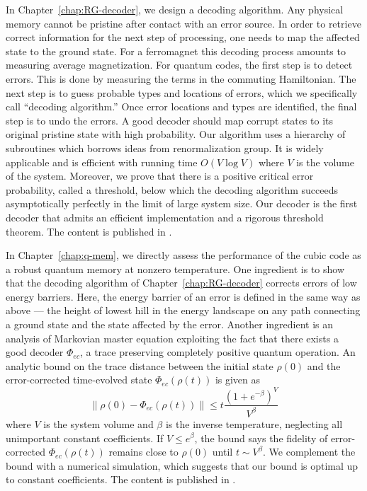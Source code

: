In Chapter~\ref{chap:RG-decoder}, we design a decoding algorithm. Any physical memory cannot be pristine after contact with an error source. In order to retrieve correct information for the next step of processing, one needs to map the affected state to the ground state. For a ferromagnet this decoding process amounts to measuring average magnetization. For quantum codes, the first step is to detect errors. This is done by measuring the terms in the commuting Hamiltonian. The next step is to guess probable types and locations of errors, which we specifically call ``decoding algorithm.'' Once error locations and types are identified, the final step is to undo the errors. A good decoder should map corrupt states to its original pristine state with high probability. Our algorithm uses a hierarchy of subroutines which borrows ideas from renormalization group. It is widely applicable and is efficient with running time $O(V\log V)$ where $V$ is the volume of the system. Moreover, we prove that there is a positive critical error probability, called a threshold, below which the decoding algorithm succeeds asymptotically perfectly in the limit of large system size. Our decoder is the first decoder that admits an efficient implementation and a rigorous threshold theorem.
The content is published in \cite{BravyiHaah2011Memory}.


In Chapter~\ref{chap:q-mem}, we directly assess the performance of the cubic code as a robust quantum memory at nonzero temperature. One ingredient is to show that the decoding algorithm of Chapter~\ref{chap:RG-decoder} corrects errors of low energy barriers. Here, the energy barrier of an error is defined in the same way as above --- the height of lowest hill in the energy landscape on any path connecting a ground state and the state affected by the error. Another ingredient is an analysis of Markovian master equation exploiting the fact that there exists a good decoder $\Phi_{ec}$, a trace preserving completely positive quantum operation. An analytic bound on the trace distance between the initial state $\rho(0)$ and the error-corrected time-evolved state $\Phi_{ec}(\rho(t))$ is given as
\[
\| \rho(0) - \Phi_{ec}(\rho(t)) \| \le t \frac{(1+e^{-\beta})^V}{V^{\beta}}
\]
where $V$ is the system volume and $\beta$ is the inverse temperature, neglecting all unimportant constant coefficients. If $V \le e^\beta$, the bound says the fidelity of error-corrected $\Phi_{ec}(\rho(t))$ remains close to $\rho(0)$ until $t \sim V^\beta$. We complement the bound with a numerical simulation, which suggests that our bound is optimal up to constant coefficients.
The content is published in \cite{BravyiHaah2011Memory}.
